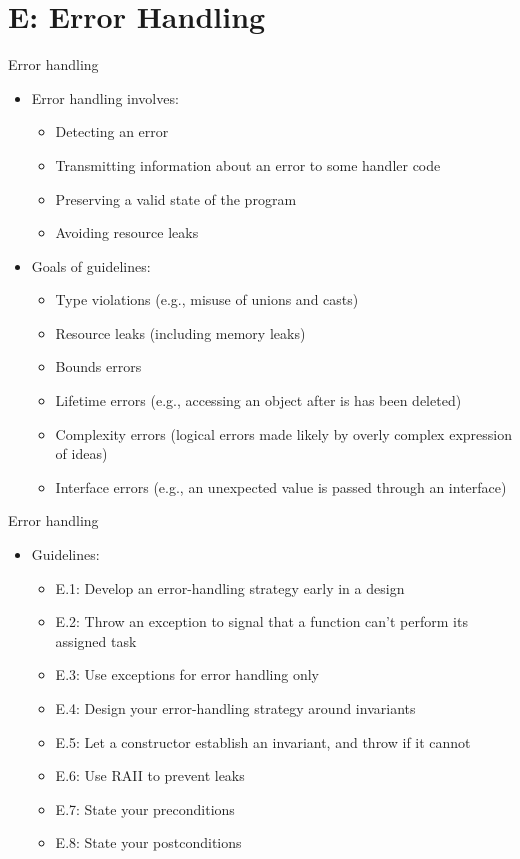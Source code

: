 \section{E: Error Handling}

\begin{frame}[t]{Error handling}
\begin{itemize}
  \item Error handling involves:
    \begin{itemize}
      \item Detecting an error
      \item Transmitting information about an error to some handler code
      \item Preserving a valid state of the program
      \item Avoiding resource leaks
    \end{itemize}

  \item Goals of guidelines:
    \begin{itemize}
      \item Type violations (e.g., misuse of unions and casts)
      \item Resource leaks (including memory leaks)
      \item Bounds errors
      \item Lifetime errors (e.g., accessing an object after is has been deleted)
      \item Complexity errors (logical errors made likely by overly complex expression of ideas)
      \item Interface errors (e.g., an unexpected value is passed through an interface)
    \end{itemize}
\end{itemize}
\end{frame}

\begin{frame}[t]{Error handling}
\begin{itemize}
  \item Guidelines:
  \begin{itemize}
      \item E.1: Develop an error-handling strategy early in a design
      \item E.2: Throw an exception to signal that a function can’t perform its assigned task
      \item E.3: Use exceptions for error handling only
      \item E.4: Design your error-handling strategy around invariants
      \item E.5: Let a constructor establish an invariant, and throw if it cannot
      \item E.6: Use RAII to prevent leaks
      \item E.7: State your preconditions
      \item E.8: State your postconditions
  \end{itemize}
\end{itemize}
\end{frame}

